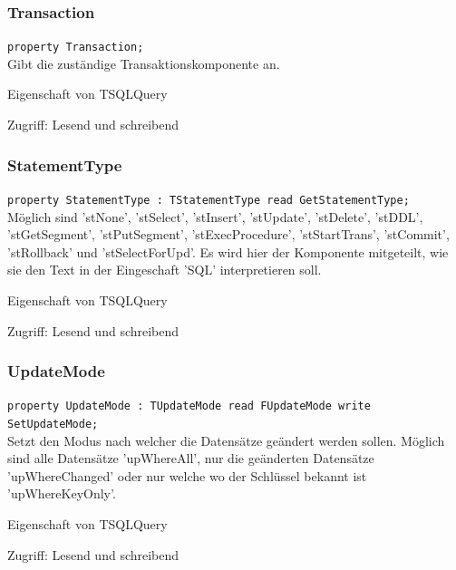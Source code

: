 \subsubsection{Transaction}
\begin{description}
  \item \texttt{property Transaction;}\\Gibt die zuständige Transaktionskomponente an.
  \begin{description}
    \item Eigenschaft von TSQLQuery
  \end{description}
  \begin{description}
    \item Zugriff: Lesend und schreibend
  \end{description}
\end{description}

\subsubsection{StatementType}
\begin{description}
  \item \texttt{property StatementType : TStatementType read GetStatementType;}\\Möglich sind 'stNone', 'stSelect', 'stInsert', 'stUpdate', 'stDelete', 'stDDL', 'stGetSegment', 'stPutSegment', 'stExecProcedure', 'stStartTrans', 'stCommit', 'stRollback' und 'stSelectForUpd'. Es wird hier der Komponente mitgeteilt, wie sie den Text in der Eingeschaft 'SQL' interpretieren soll.
  \begin{description}
    \item Eigenschaft von TSQLQuery
  \end{description}
  \begin{description}
    \item Zugriff: Lesend und schreibend
  \end{description}
\end{description}

\subsubsection{UpdateMode}
\begin{description}
  \item \texttt{property UpdateMode : TUpdateMode read FUpdateMode write SetUpdateMode;}\\Setzt den Modus nach welcher die Datensätze geändert werden sollen. Möglich sind alle Datensätze 'upWhereAll', nur die geänderten Datensätze 'upWhereChanged' oder nur welche wo der Schlüssel bekannt ist 'upWhereKeyOnly'.
  \begin{description}
    \item Eigenschaft von TSQLQuery
  \end{description}
  \begin{description}
    \item Zugriff: Lesend und schreibend
  \end{description}
\end{description}

